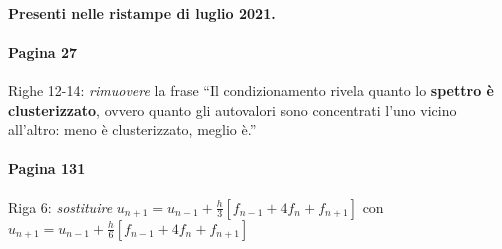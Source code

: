 
\paragraph{Presenti nelle ristampe di luglio 2021.}

\paragraph{Pagina 27} Righe 12-14: \emph{rimuovere} la frase ``Il condizionamento rivela quanto lo \textbf{spettro è clusterizzato}, ovvero quanto gli autovalori sono concentrati l'uno vicino all'altro: meno è clusterizzato, meglio è.''

\paragraph{Pagina 131} Riga 6: \emph{sostituire} $u_{n+1} =u_{n-1} +\frac{h}{3}[ f_{n-1} +4f_{n} +f_{n+1}]$ con $u_{n+1} =u_{n-1} +\frac{h}{6}[ f_{n-1} +4f_{n} +f_{n+1}]$